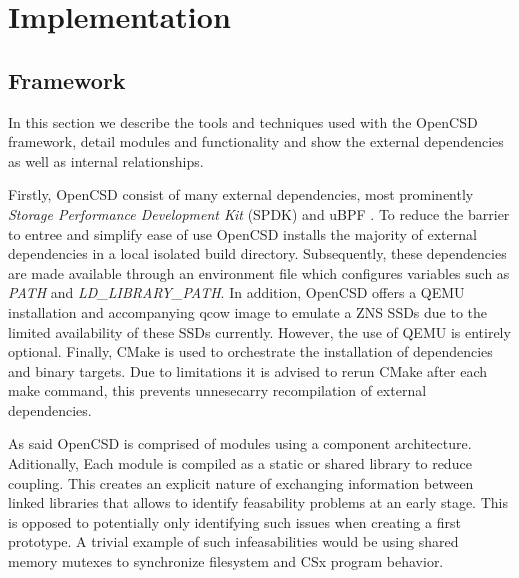 
\chapter{Implementation} %



\ifpdf
    \graphicspath{{7/figures/PNG/}{7/figures/PDF/}{7/figures/}}
\else
    \graphicspath{{7/figures/EPS/}{7/figures/}}
\fi

\section{Framework}

In this section we describe the tools and techniques used with the OpenCSD
framework, detail modules and functionality and show the external dependencies
as well as internal relationships.

Firstly, OpenCSD consist of many external dependencies, most prominently
\textit{Storage Performance Development Kit} (SPDK) \cite{spdk} and uBPF
\cite{ubpf}. To reduce the barrier to entree and simplify ease of use OpenCSD
installs the majority of external dependencies in a local isolated build
directory. Subsequently, these dependencies are made available through an
environment file which configures variables such as \textit{PATH} and
\textit{LD\_LIBRARY\_PATH}. In addition, OpenCSD offers a QEMU installation and
accompanying qcow image to emulate a ZNS SSDs due to the limited availability of
these SSDs currently. However, the use of QEMU is entirely optional. Finally,
CMake \cite{cmake} is used to orchestrate the installation of dependencies and
binary targets. Due to limitations it is advised to rerun CMake after each make
command, this prevents unnesecarry recompilation of external
dependencies\footnotemark[9].


As said OpenCSD is comprised of modules using a component architecture.
Aditionally, Each module is compiled as a static or shared library to reduce
coupling. This creates an explicit nature of exchanging information between
linked libraries that allows to identify feasability problems at an early stage.
This is opposed to potentially only identifying such issues when creating a
first prototype. A trivial example of such infeasabilities would be using shared
memory mutexes to synchronize filesystem and CSx program behavior.

